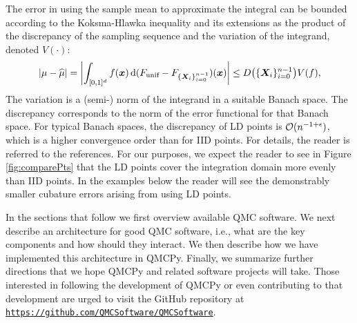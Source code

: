 \documentclass[graybox,footinfo]{svmult}
\newcommand{\QMCPYabs}[1]{\ensuremath{{\left \lvert #1 \right \rvert}}}
\newcommand{\QMCPYbiggabs}[1]{\ensuremath{{\biggl \lvert #1 \biggr \rvert}}}
\newcommand{\hmu}{\widehat{\mu}}
\newcommand{\unif}{\textup{unif}}
\newcommand{\cube}{[0,1]^d}
\begin{document}
The error in using the sample mean to approximate the integral can be bounded according to the Koksma-Hlawka inequality and its extensions as the product of the discrepancy of the sampling sequence and the variation of the integrand, denoted $V(\cdot)$:
\begin{equation}
	\QMCPYabs{\mu - \hmu} = \QMCPYbiggabs{\int_{\cube} f(\bsx) \, \D (F_\unif - F_{\{\bsX_i\}_{i=0}^{n-1}}) (\bsx)} \le D\bigl(\{\bsX_i\}_{i=0}^{n-1}\bigr) V(f),
\end{equation} 
The variation is a (semi-) norm of the integrand in a suitable Banach space.  The discrepancy corresponds to the norm of the error functional for that Banach space.  For typical Banach spaces, the discrepancy of LD points is ${\mathcal{O}}(n^{-1+\epsilon})$, which is a higher convergence order than for IID points.  For details, the reader is referred to the references.  For our purposes, we expect the reader to see in Figure \ref{fig:comparePts} that the LD points cover the integration domain more evenly than IID points.  In the examples below the reader will see the demonstrably smaller cubature errors arising from using LD points.

In the sections that follow we first overview available QMC software.  We next describe an architecture for good QMC software, i.e., what are the key components and how should they interact.  We then describe how we have implemented this architecture in QMCPy.  Finally, we summarize further directions that we hope QMCPy and related software projects will take.  Those interested in following the development of QMCPy or even contributing to that development are urged to visit the GitHub repository at \href{https://github.com/QMCSoftware/QMCSoftware}{\nolinkurl{https://github.com/QMCSoftware/QMCSoftware}}.
\end{document}
